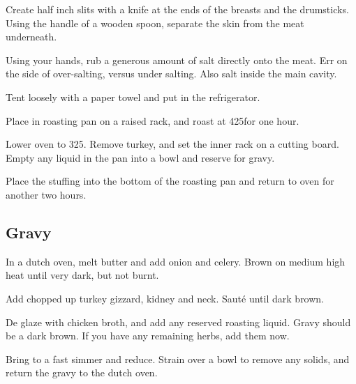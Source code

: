 \begin{recipe}
Create half inch slits with a knife at the ends of the breasts and the drumsticks. Using the handle of a wooden spoon, separate the skin from the meat underneath.

Using your hands, rub a generous amount of salt directly onto the meat. Err on the side of over-salting, versus under salting. Also salt inside the main cavity.

Tent loosely with a paper towel and put in the refrigerator.

Place in roasting pan on a raised rack, and roast at 425\degree for one hour.

Lower oven to 325\degree. Remove turkey, and set the inner rack on a cutting board. Empty any liquid in the pan into a bowl and reserve for gravy.

Place the stuffing into the bottom of the roasting pan and return to oven for another two hours.

\subsection{Gravy}



In a dutch oven, melt butter and add onion and celery. Brown on medium high heat until very dark, but not burnt.

Add chopped up turkey gizzard, kidney and neck. Sauté until dark brown.


De glaze with chicken broth, and add any reserved roasting liquid. Gravy should be a dark brown. If you have any remaining herbs, add them now.

Bring to a fast simmer and reduce. Strain over a bowl to remove any solids, and return the gravy to the dutch oven.



\end{recipe}
